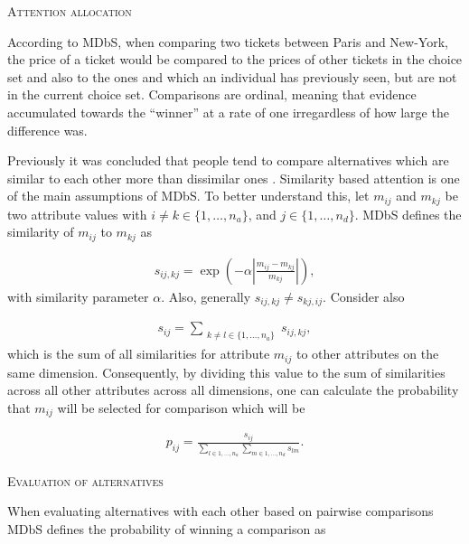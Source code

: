 \documentclass[a4paper,12pt]{article}
\begin{document}
\textsc{Attention allocation}

According to MDbS, when comparing two tickets between Paris and New-York, the price of a ticket would be compared to the prices of other tickets in the choice set and also to the ones and which an individual has previously seen, but are not in the current choice set. Comparisons are ordinal, meaning that evidence accumulated towards the ``winner'' at a rate of one irregardless of how large the difference was. 

Previously it was concluded that people tend to compare alternatives which are similar to each other more than dissimilar ones \citep{noguchi2014attraction}. Similarity based attention is one of the main assumptions of MDbS. To better understand this, let $m_{ij}$ and $m_{kj}$ be two attribute values with $i \neq k \in \{1, \ldots, n_a\}$, and $j \in \{1, \ldots, n_d\}$. MDbS defines the similarity of $m_{ij}$ to $m_{kj}$ as

\begin{align}\label{similarityMDBS}
s_{ij,kj} = \exp \left( - \alpha \left| \frac{m_{ij} - m_{kj}}{m_{kj}} \right| \right) ,
\end{align}
with similarity parameter $\alpha$. Also, generally $s_{ij,kj} \neq s_{kj,ij}.$ Consider also 

\begin{align}\label{sumOfSimilaritiesMDbS}
    s_{ij} = \sum_{\substack{k \neq l \in \{1, \ldots, n_a\}}} s_{ij,kj}  ,
\end{align}
which is the sum of all similarities for attribute $m_{ij}$ to other attributes on the same dimension. Consequently, by dividing this value to the sum of similarities across all other attributes across all dimensions, one can calculate the probability that $m_{ij}$ will be selected for comparison which will be 

\begin{align}\label{probabilityOfComparison}
    p_{ij} = \frac{s_{ij}}{\sum_{l \in {1, \ldots, n_a}} \sum_{m \in {1, \ldots, n_d}} s_{lm}} .
\end{align}

\textsc{Evaluation of alternatives}

When evaluating alternatives with each other based on pairwise comparisons MDbS defines the probability of winning a comparison as 
\end{document}
